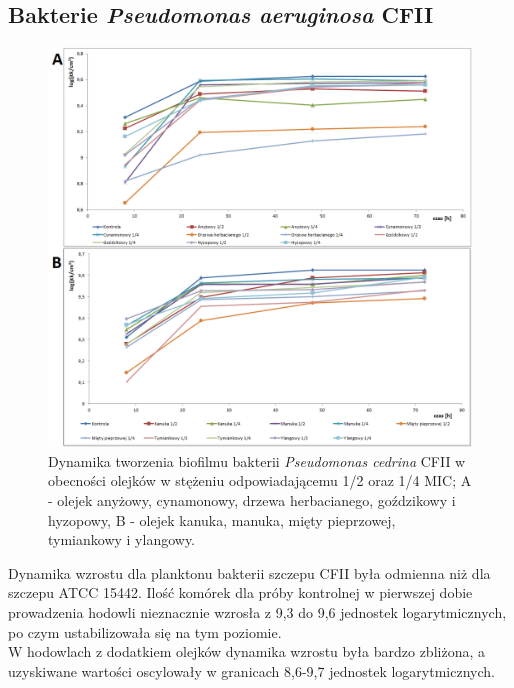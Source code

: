 \documentclass[11pt,a4paper]{report}
\begin{document}
\subsection{Bakterie \textit{Pseudomonas aeruginosa} CFII}
\begin{figure}[!h]
\begin{center}
\includegraphics[scale=0.50]{img/cfii-c.png}
\caption{Dynamika tworzenia biofilmu bakterii \textit{Pseudomonas cedrina} CFII w obecności olejków w stężeniu odpowiadającemu 1/2 oraz 1/4 MIC; A - olejek anyżowy, cynamonowy, drzewa herbacianego, goździkowy i hyzopowy, B - olejek kanuka, manuka, mięty pieprzowej, tymiankowy i ylangowy.}\label{cfii-c}
\end{center} 
\end{figure}

\clearpage
Dynamika wzrostu dla planktonu bakterii szczepu CFII była odmienna niż dla szczepu ATCC 15442. Ilość komórek dla próby kontrolnej w pierwszej dobie prowadzenia hodowli nieznacznie wzrosła z 9,3 do 9,6 jednostek logarytmicznych, po czym ustabilizowała się na tym poziomie.\\
W hodowlach z dodatkiem olejków dynamika wzrostu była bardzo zbliżona, a uzyskiwane wartości oscylowały w granicach 8,6-9,7 jednostek logarytmicznych.

\clearpage
\end{document}
